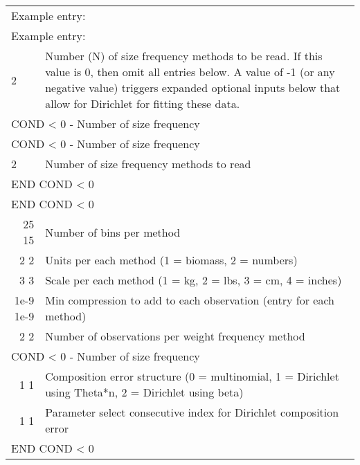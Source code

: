 \begin{center}
	\begin{tabular}{p{1.4cm} p{0.7cm} p{12.8 cm}}
		\multicolumn{3}{l}{Example entry:} \\
		\multicolumn{3}{l}{Example entry:}  \\
		\hline
		2 & & Number (N) of size frequency methods to be read. If this value is 0, then omit all entries below. A value of -1 (or any negative value) triggers expanded optional inputs below that allow for Dirichlet 
		for fitting these data. \Tstrut\Bstrut\\
		\hline
		\multicolumn{3}{l}{COND < 0 - Number of size frequency} \Tstrut\\
		\multicolumn{3}{l}{COND < 0 - Number of size frequency} \Tstrut\\
		\multicolumn{2}{l}{2} & Number of size frequency methods to read \Tstrut\\
		\multicolumn{3}{l}{END COND < 0} \Bstrut\\
		\multicolumn{3}{l}{END COND < 0} \Bstrut\\
		\hline
		\multicolumn{2}{r}{25 15} & Number of bins per method \Tstrut\\
		\multicolumn{2}{r}{2 2} & Units per each method (1 = biomass, 2 = numbers) \\
		\multicolumn{2}{r}{3 3} & Scale per each method (1 = kg, 2 = lbs, 3 = cm, 4 = inches) \\
		\multicolumn{2}{r}{1e-9 1e-9} & Min compression to add to each observation (entry for each method) \\
		\multicolumn{2}{r}{2 2} & Number of observations per weight frequency method \Bstrut\\
		\hline
		\multicolumn{3}{l}{COND < 0 - Number of size frequency} \Tstrut\\
		\multicolumn{2}{r}{1 1} & Composition error structure (0 = multinomial, 1 = Dirichlet using Theta*n, 2 = Dirichlet using beta) \Tstrut\\
		\multicolumn{2}{r}{1 1} & Parameter select consecutive index for Dirichlet 
		composition error \Bstrut\\
		\multicolumn{3}{l}{END COND < 0} \Tstrut\\
		\hline
	\end{tabular}
\end{center}

